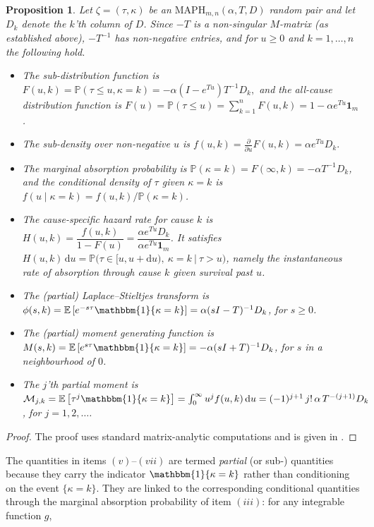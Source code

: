 \documentclass{article}
\newtheorem{proposition}{Proposition}
\newcommand{\Prob}{\mathbb{P}}
\newcommand{\ind}[1]{\mathbbm{1}\{#1\}}
\begin{document}
\begin{proposition}
\label{prop:maph-props}
Let $\zeta = (\tau,\kappa)$ be an $\text{MAPH}_{m,n}(\alpha,T,D)$ random pair and let $D_k$ denote the $k$'th column of $D$. Since $-T$ is a non-singular $M$-matrix (as established above), $-T^{-1}$ has non-negative entries, and for $u \ge 0$ and $k=1,\ldots,n$ the following hold.
\begin{itemize}
    \item[(i)] The sub-distribution function is $F(u,k) = \Prob(\tau \le u, \kappa = k)= -\alpha(I-e^{Tu})T^{-1}D_k,$ and the all-cause distribution function is $F(u) = \Prob(\tau \le u) = \sum_{k=1}^n F(u,k) = 1 - \alpha e^{Tu}\mathbf{1}_m$.
    \item[(ii)] The sub-density over non-negative $u$ is $f(u,k) = \frac{\partial}{\partial u} F(u,k) =  \alpha e^{T u}D_k.$
    \item[(iii)] The marginal absorption probability is $\Prob(\kappa = k) = F(\infty,k) = -\alpha T^{-1}D_k$, and the conditional density of $\tau$ given $\kappa = k$ is $f(u \mid \kappa = k) = f(u,k)/\Prob(\kappa = k)$.
    \item[(iv)] The cause-specific hazard rate for cause $k$ is
    $H(u,k) = \dfrac{f(u,k)}{1-F(u)} = \dfrac{\alpha e^{Tu}D_k}{\alpha e^{Tu}\mathbf{1}_m}$.
    It satisfies $H(u,k)\,\mathrm{d}u = \Prob\big(\tau \in [u,u+\mathrm{d}u),~ \kappa = k ~\big|~ \tau > u\big)$, namely the instantaneous rate of absorption through cause $k$ given survival past $u$.
    \item[(v)] The (partial) Laplace--Stieltjes transform is $\phi(s,k) = \mathbb{E}\left[e^{-s\tau}\ind{\kappa=k}\right]  =\alpha(sI-T)^{-1}D_k$, for $s \ge 0$.
    \item[(vi)] The (partial) moment generating function is  $M(s,k)= \mathbb{E}\left[e^{s\tau}\ind{\kappa=k}\right] = -\alpha(sI+T)^{-1}D_k$, for $s$ in a neighbourhood of $0$.
    \item[(vii)] The $j$'th partial moment is $\mathcal{M}_{j,k} = \mathbb{E} \left[\tau^j \ind{\kappa=k} \right]= \int_{0}^{\infty} u^j f(u,k)\,\mathrm{d}u = (-1)^{j+1}\, j!\, \alpha\, T^{-(j+1)}D_k$, for $j = 1,2,\ldots$.
\end{itemize}
\end{proposition}
\begin{proof}
The proof uses standard matrix-analytic computations and is given in .
\end{proof}
%
The quantities in items $(v)$--$(vii)$ are termed \emph{partial} (or sub-) quantities because they carry the indicator $\ind{\kappa=k}$ rather than conditioning on the event $\{\kappa=k\}$. They are linked to the corresponding conditional quantities through the marginal absorption probability of item $(iii)$: for any integrable function $g$,
\end{document}
